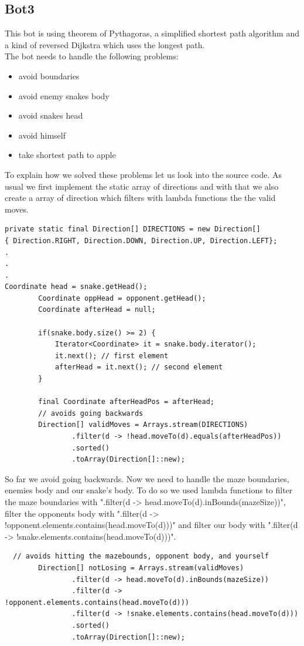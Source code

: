 \documentclass[a4paper,12pt]{article}
\begin{document}
\subsection{Bot3}
This bot is using theorem of Pythagoras, a simplified shortest path algorithm and a kind of reversed Dijkstra which uses the longest path.\\
The bot needs to handle the following problems:
\begin{itemize}
\item avoid boundaries
\item avoid enemy snakes body
\item avoid snakes head
\item avoid himself
\item take shortest path to apple
\end{itemize}
To explain how we solved these problems let us look into the source code.
As usual we first implement the static array of directions and with that we also create a array of direction which filters with lambda functions the the valid moves.
\newpage
\begin{verbatim}
private static final Direction[] DIRECTIONS = new Direction[] 
{ Direction.RIGHT, Direction.DOWN, Direction.UP, Direction.LEFT};
.
.
.
Coordinate head = snake.getHead();
        Coordinate oppHead = opponent.getHead();
        Coordinate afterHead = null;

        if(snake.body.size() >= 2) {
            Iterator<Coordinate> it = snake.body.iterator();
            it.next(); // first element
            afterHead = it.next(); // second element
        }

        final Coordinate afterHeadPos = afterHead;
        // avoids going backwards
        Direction[] validMoves = Arrays.stream(DIRECTIONS)
                .filter(d -> !head.moveTo(d).equals(afterHeadPos))
                .sorted()
                .toArray(Direction[]::new);
\end{verbatim}
So far we avoid going backwards. Now we need to handle the maze boundaries, enemies body and our snake's body. To do so we used lambda functions to filter the maze boundaries with 
".filter(d -> head.moveTo(d).inBounds(mazeSize))", filter the opponents body with ".filter(d -> !opponent.elements.contains(head.moveTo(d)))" and filter our body with ".filter(d -> !snake.elements.contains(head.moveTo(d)))".
\begin{verbatim}
  // avoids hitting the mazebounds, opponent body, and yourself
        Direction[] notLosing = Arrays.stream(validMoves)
                .filter(d -> head.moveTo(d).inBounds(mazeSize))
                .filter(d -> !opponent.elements.contains(head.moveTo(d)))
                .filter(d -> !snake.elements.contains(head.moveTo(d)))
                .sorted()
                .toArray(Direction[]::new);
\end{verbatim}
\end{document}
